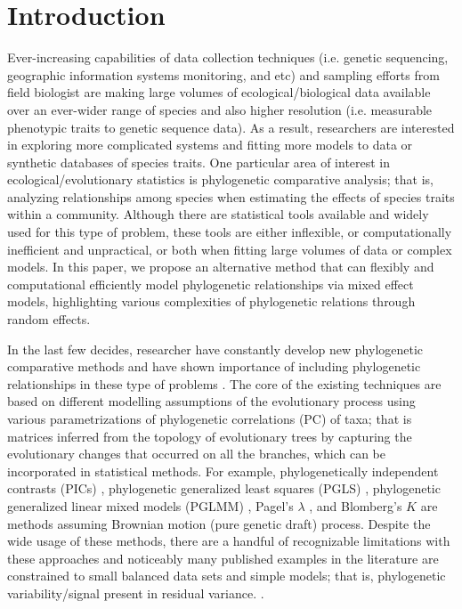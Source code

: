 \section{Introduction}

Ever-increasing capabilities of data collection techniques (i.e. genetic sequencing, geographic information systems monitoring, and etc) and sampling efforts from field biologist are making large volumes of ecological/biological data available over an ever-wider range of species and also higher resolution (i.e. measurable phenotypic traits to genetic sequence data). 
As a result, researchers are interested in exploring more complicated systems and fitting more models to data or synthetic databases of species traits.
One particular area of interest in ecological/evolutionary statistics is phylogenetic comparative analysis; that is, analyzing relationships among species when estimating the effects of species traits within a community. 
Although there are statistical tools available and widely used for this type of problem, these tools are either inflexible, or computationally inefficient and unpractical, or both when fitting large volumes of data or complex models.
In this paper, we propose an alternative method that can flexibly and computational efficiently model phylogenetic relationships via mixed effect models, highlighting various complexities of phylogenetic relations through random effects.  

In the last few decides, researcher have constantly develop new phylogenetic comparative methods and have shown importance of including phylogenetic relationships in these type of problems \cite{felsenstein1985phylogenies, li2017statistical}. 
The core of the existing techniques are based on different modelling assumptions of the evolutionary process using various parametrizations of phylogenetic correlations (PC) of taxa; that is matrices inferred from the topology of evolutionary trees by capturing the evolutionary changes that occurred on all the branches, which can be incorporated in statistical methods. 
For example, phylogenetically independent contrasts (PICs) \citep{felsenstein1985phylogenies}, phylogenetic generalized least squares (PGLS) \citep{grafen1989phylogenetic}, phylogenetic generalized linear mixed models (PGLMM) \citep{ives2011generalized}, Pagel's $\lambda$ \citep{pagel1999inferring}, and Blomberg's $K$ \citep{blomberg2003testing} are methods assuming Brownian motion (pure genetic draft) process. 
Despite the wide usage of these methods, there are a handful of recognizable limitations with these approaches and noticeably many published examples in the literature are constrained to small balanced data sets and simple models; that is, phylogenetic variability/signal present in residual variance. \citep{li2017canfun}.

